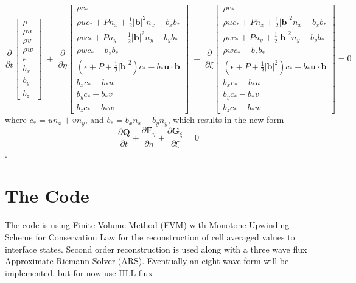 \documentclass[paper=a4, fontsize=11pt]{scrartcl}
\newcommand{\pfrac}[2]{\frac{\partial#1}{\partial#2}}
\numberwithin{equation}{section}                %
\numberwithin{figure}{section}                  %
\numberwithin{table}{section}                           %
\begin{document}
\[
  \pfrac{}{t}
  \begin{bmatrix}
    \rho  \\
    \rho u  \\
    \rho v \\
    \rho w \\
    \epsilon\\
    b_x \\
    b_y \\
    b_z 
  \end{bmatrix}
  \;+\;\pfrac{}{\eta}
  \begin{bmatrix}
    \rho c_*  \\
    \rho u c_* + P n_x + \frac{1}{2}|\mathbf{b}|^2 n_x- b_x b_*\\
    \rho v c_* + P n_y + \frac{1}{2}|\mathbf{b}|^2 n_y - b_y b_* \\
    \rho w c_* - b_z b_*\\
    \left(\epsilon+ P + \frac{1}{2}|\mathbf{b}|^2 \right) c_* - b_* \mathbf{u}\cdot\mathbf{b}\\
    b_x c_* - b_* u\\
    b_y c_* - b_* v \\
    b_z c_* - b_* w 
  \end{bmatrix}
  \;+\;\pfrac{}{\xi}
  \begin{bmatrix}
    \rho c_*  \\
    \rho u c_* + P n_x + \frac{1}{2}|\mathbf{b}|^2 n_x - b_x b_* \\
    \rho v c_* + P n_y + \frac{1}{2}|\mathbf{b}|^2 n_y - b_y b_* \\
    \rho w c_* - b_z b_* \\
    \left(\epsilon+ P + \frac{1}{2}|\mathbf{b}|^2  \right) c_* - b_*\mathbf{u}\cdot\mathbf{b}\\
    b_x c_* - b_* u \\
    b_y c_* - b_* v \\
    b_z c_* - b_* w 
  \end{bmatrix}
  =0
\]
where $c_* = u n_x + v n_y$, and $b_* = b_x n_x + b_y n_y $, which results in the new form
\begin{equation} \label{eqn:mhdvecfluxarb}
  \pfrac{\mathbf{Q}}{t} + \pfrac{\mathbf{F}_\eta}{\eta} + \pfrac{\mathbf{G}_\xi}{\xi} = 0
\end{equation}.

\section{The Code}\label{sec:code}
The code is using Finite Volume Method (FVM) with Monotone Upwinding Scheme for Conservation Law for the reconstruction of cell averaged values to interface states. Second order reconstruction is used along with a three wave flux Approximate Riemann Solver (ARS). Eventually an eight wave form will be implemented, but for now use HLL flux \cite{harten1983}
\end{document}
